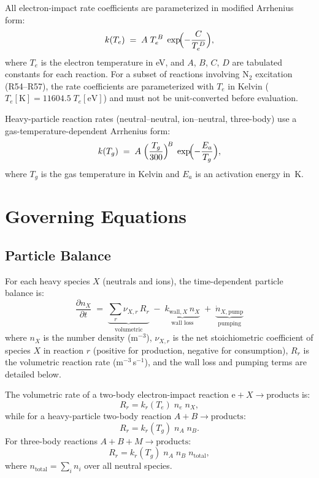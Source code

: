 \documentclass[11pt,a4paper]{article}
\newcommand{\species}[1]{\ensuremath{\mathrm{#1}}}
\newcommand{\ee}{\species{e}}
\newcommand{\ddt}[1]{\frac{\partial #1}{\partial t}}
\newcommand{\Te}{\ensuremath{T_e}}
\newcommand{\Tg}{\ensuremath{T_g}}
\renewcommand{\ne}{\ensuremath{n_e}}
\begin{document}
All electron-impact rate coefficients are parameterized in modified Arrhenius form:
\begin{equation}
  \label{eq:arrhenius_Te}
  k(\Te) \;=\; A\;\Te^{\,B}\;\exp\!\Bigl(-\frac{C}{\Te^{\,D}}\Bigr),
\end{equation}
where $\Te$ is the electron temperature in eV, and $A$, $B$, $C$, $D$ are
tabulated constants for each reaction. For a subset of reactions involving N$_2$
excitation (R54--R57), the rate coefficients are parameterized with $\Te$ in Kelvin
($\Te[\mathrm{K}] = 11604.5\;\Te[\mathrm{eV}]$) and must not be unit-converted before
evaluation.

Heavy-particle reaction rates (neutral--neutral, ion--neutral, three-body) use a
gas-temperature-dependent Arrhenius form:
\begin{equation}
  \label{eq:arrhenius_Tg}
  k(\Tg) \;=\; A\;\Bigl(\frac{\Tg}{300}\Bigr)^{\!B}\;
  \exp\!\Bigl(-\frac{E_a}{\Tg}\Bigr),
\end{equation}
where $\Tg$ is the gas temperature in Kelvin and $E_a$ is an activation energy in~K.


\section{Governing Equations}
\label{sec:equations}

\subsection{Particle Balance}

For each heavy species $X$ (neutrals and ions), the time-dependent particle
balance is:
\begin{equation}
  \label{eq:particle_balance}
  \boxed{
  \ddt{n_X} \;=\;
    \underbrace{\sum_r \nu_{X,r}\,R_r}_{\text{volumetric}}
    \;-\; \underbrace{k_{\text{wall},X}\,n_X}_{\text{wall loss}}
    \;+\; \underbrace{\dot{n}_{X,\text{pump}}}_{\text{pumping}}
  }
\end{equation}
where $n_X$ is the number density (m$^{-3}$), $\nu_{X,r}$ is the net
stoichiometric coefficient of species $X$ in reaction $r$ (positive for
production, negative for consumption), $R_r$ is the volumetric reaction rate
(m$^{-3}$\,s$^{-1}$), and the wall loss and pumping terms are detailed below.

The volumetric rate of a two-body electron-impact reaction $\ee + X \to
\text{products}$ is:
\begin{equation}
  R_r = k_r(\Te)\;\ne\;n_X,
\end{equation}
while for a heavy-particle two-body reaction $A + B \to \text{products}$:
\begin{equation}
  R_r = k_r(\Tg)\;n_A\;n_B.
\end{equation}
For three-body reactions $A + B + M \to \text{products}$:
\begin{equation}
  R_r = k_r(\Tg)\;n_A\;n_B\;n_{\text{total}},
\end{equation}
where $n_{\text{total}} = \sum_i n_i$ over all neutral species.
\end{document}
